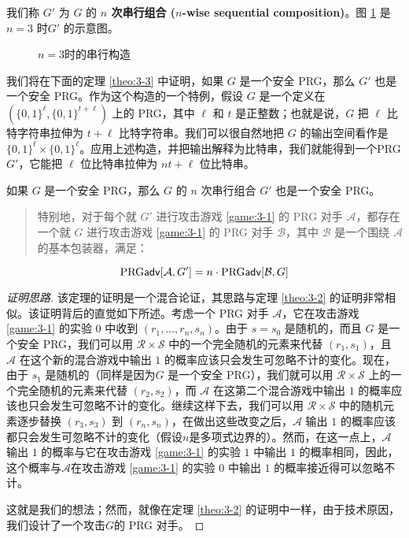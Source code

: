 \vspace*{5pt}

\noindent
我们称 $G'$ 为 $G$ 的 \textbf{$n$ 次串行组合 ($n$-wise sequential composition)}。图 \ref{fig:3-6} 是 $n=3$ 时$G'$ 的示意图。

\begin{figure}
	\centering
	
	\caption{$n=3$时的串行构造}
	\label{fig:3-6}
\end{figure}

我们将在下面的定理 \ref{theo:3-3} 中证明，如果 $G$ 是一个安全 PRG，那么 $G'$ 也是一个安全 PRG。作为这个构造的一个特例，假设 $G$ 是一个定义在 $(\{0,1\}^\ell,\{0,1\}^{t+\ell})$ 上的 PRG，其中 $\ell$ 和 $t$ 是正整数；也就是说，$G$ 把 $\ell$ 比特字符串拉伸为 $t+\ell$ 比特字符串。我们可以很自然地把 $G$ 的输出空间看作是 $\{0,1\}^t\times\{0,1\}^\ell$。应用上述构造，并把输出解释为比特串，我们就能得到一个PRG $G'$，它能把 $\ell$ 位比特串拉伸为 $nt+\ell$ 位比特串。

\begin{theorem}\label{theo:3-3}
如果 $G$ 是一个安全 PRG，那么 $G$ 的 $n$ 次串行组合 $G'$ 也是一个安全 PRG。
\begin{quote}
特别地，对于每个就 $G'$ 进行攻击游戏 \ref{game:3-1} 的 PRG 对手 $\mathcal A$，都存在一个就 $G$ 进行攻击游戏 \ref{game:3-1} 的 PRG 对手 $\mathcal B$，其中 $\mathcal B$ 是一个围绕 $\mathcal A$ 的基本包装器，满足：
\end{quote}
$$
{\rm PRG\mathsf{adv}}[\mathcal{A},G']=n\cdot{\rm PRG\mathsf{adv}}[\mathcal{B},G]
$$
\end{theorem}

\begin{proof}[证明思路]
该定理的证明是一个混合论证，其思路与定理 \ref{theo:3-2} 的证明非常相似。该证明背后的直觉如下所述。考虑一个 PRG 对手 $\mathcal A$，它在攻击游戏 \ref{game:3-1} 的实验 $0$ 中收到 $(r_1,\dots,r_n,s_n)$。由于 $s=s_0$ 是随机的，而且 $G$ 是一个安全 PRG，我们可以用 $\mathcal{R}\times\mathcal{S}$ 中的一个完全随机的元素来代替 $(r_1,s_1)$，且 $\mathcal A$ 在这个新的混合游戏中输出 $1$ 的概率应该只会发生可忽略不计的变化。现在，由于 $s_1$ 是随机的（同样是因为$G$ 是一个安全 PRG），我们就可以用 $\mathcal{R}\times\mathcal{S}$ 上的一个完全随机的元素来代替 $(r_2,s_2)$，而 $\mathcal A$ 在这第二个混合游戏中输出 $1$ 的概率应该也只会发生可忽略不计的变化。继续这样下去，我们可以用 $\mathcal{R}\times\mathcal{S}$ 中的随机元素逐步替换 $(r_3,s_3)$ 到 $(r_n,s_n)$，在做出这些改变之后，$\mathcal A$ 输出 $1$ 的概率应该都只会发生可忽略不计的变化（假设$n$是多项式边界的）。然而，在这一点上，$\mathcal A$ 输出 $1$ 的概率与它在攻击游戏 \ref{game:3-1} 的实验 $1$ 中输出 $1$ 的概率相同，因此，这个概率与$\mathcal A$在攻击游戏 \ref{game:3-1} 的实验 $0$ 中输出 $1$ 的概率接近得可以忽略不计。

这就是我们的想法；然而，就像在定理 \ref{theo:3-2} 的证明中一样，由于技术原因，我们设计了一个攻击$G$的 PRG 对手。
\end{proof}

